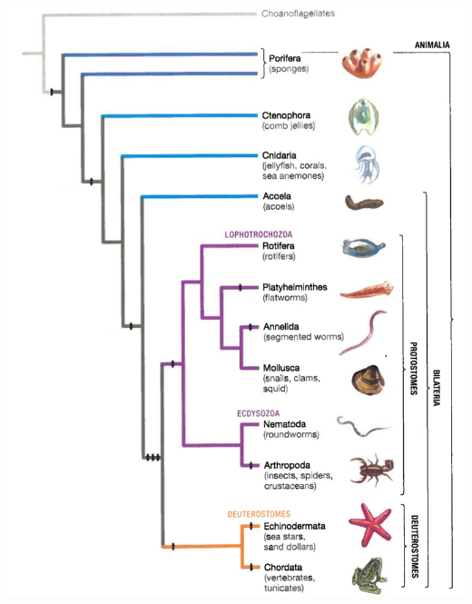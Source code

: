 \begin{frame}
\begin{adjustwidth}{-2em}{-1.5em}
\begin{columns}[t]
                \vspace{-2mm}
                \includegraphics[height=\textheight]{animal-phylogeny-masked.png}

        \end{columns}
    \end{adjustwidth}

\end{frame}

